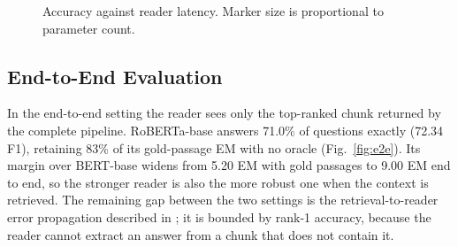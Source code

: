 \documentclass[conference]{IEEEtran}
\begin{document}
\begin{figure}[t]
\centering
{}
\caption{Accuracy against reader latency. Marker size is proportional to parameter count.}
\label{fig:tradeoff}
\end{figure}

\subsection{End-to-End Evaluation}
In the end-to-end setting the reader sees only the top-ranked chunk returned by the complete
pipeline. RoBERTa-base answers 71.0\% of questions exactly (72.34 F1), retaining 83\% of its
gold-passage EM with no oracle (Fig.~\ref{fig:e2e}). Its margin over BERT-base widens
from 5.20 EM with gold passages to 9.00 EM end to end, so the stronger reader is also the more
robust one when the context is retrieved. The remaining gap between the two settings is the
retrieval-to-reader error propagation described in \cite{liu2023}; it is bounded by rank-1
accuracy, because the reader cannot extract an answer from a chunk that does not contain it.
\end{document}
